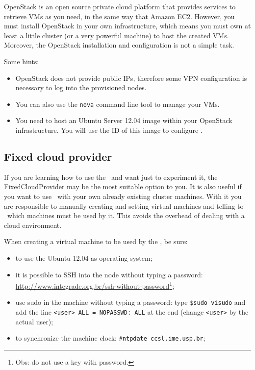 OpenStack is an open source private cloud platform that provides services to retrieve VMs as you need, in the same way that Amazon EC2. However, you must install OpenStack in your own infrastructure, which means you must own at least a little cluster (or a very powerful machine) to host the created VMs. Moreover, the OpenStack installation and configuration is not a simple task.

Some hints:

\begin{itemize}
\item OpenStack does not provide public IPs, therefore some VPN configuration is necessary to log into the provisioned nodes.
\item You can also use the \texttt{nova} command line tool to manage your VMs.
\item You need to host an Ubuntu Server 12.04 image within your OpenStack infrastructure. You will use the ID of this image to configure \ee.
\end{itemize}

\subsection{Fixed cloud provider}

If you are learning how to use the \ee\ and want just to experiment it, the \textsf{FixedCloudProvider} may be the most suitable option to you. 
It is also useful if you want to use \ee\ with your own already existing cluster machines.
With it you are responsible to manually creating and setting virtual machines and telling to \ee\ which machines must be used by it. This avoids the overhead of dealing with a cloud environment. 

When creating a virtual machine to be used by the \ee, be sure:
\begin{itemize}
\item to use the Ubuntu 12.04 as operating system;
\item it is possible to SSH into the node without typing a password: \url{http://www.integrade.org.br/ssh-without-password}\footnote{Obs: do not use a key with password.};
\item use sudo in the machine without typing a password: type \texttt{\$sudo visudo} and add the line \texttt{<user> ALL = NOPASSWD: ALL} at the end (change \texttt{<user>} by the actual user);
\item to synchronize the machine clock: \texttt{\#ntpdate ccsl.ime.usp.br};
\end{itemize}


